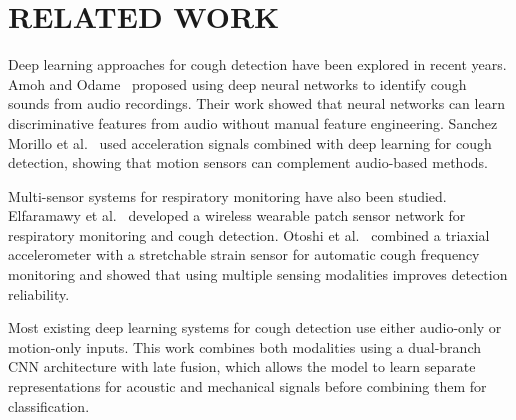 \chapter{RELATED WORK}

Deep learning approaches for cough detection have been explored in recent years. Amoh and Odame~\cite{amoh2016} proposed using deep neural networks to identify cough sounds from audio recordings. Their work showed that neural networks can learn discriminative features from audio without manual feature engineering. Sanchez Morillo et al.~\cite{sanchezmorillo2024} used acceleration signals combined with deep learning for cough detection, showing that motion sensors can complement audio-based methods.

Multi-sensor systems for respiratory monitoring have also been studied. Elfaramawy et al.~\cite{elfaramawy2017} developed a wireless wearable patch sensor network for respiratory monitoring and cough detection. Otoshi et al.~\cite{otoshi2021} combined a triaxial accelerometer with a stretchable strain sensor for automatic cough frequency monitoring and showed that using multiple sensing modalities improves detection reliability.

Most existing deep learning systems for cough detection use either audio-only or motion-only inputs. This work combines both modalities using a dual-branch CNN architecture with late fusion, which allows the model to learn separate representations for acoustic and mechanical signals before combining them for classification.
